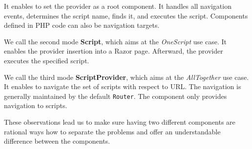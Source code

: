 It enables to set the provider as a root component.
It handles all navigation events, determines the script name, finds it, and executes the script.
Components defined in PHP code can also be navigation targets.
\par
We call the second mode \textbf{Script}, which aims at the \textit{OneScript} use case.
It enables the provider insertion into a Razor page.
Afterward, the provider executes the specified script.
\par
We call the third mode \textbf{ScriptProvider}, which aims at the \textit{AllTogether} use case.
It enables to navigate the set of scripts with respect to URL.
The navigation is generally maintained by the default \texttt{Router}.
The component only provides navigation to scripts.
\par
These observations lead us to make sure having two different components are rational ways how to separate the problems and offer an understandable difference between the components.


